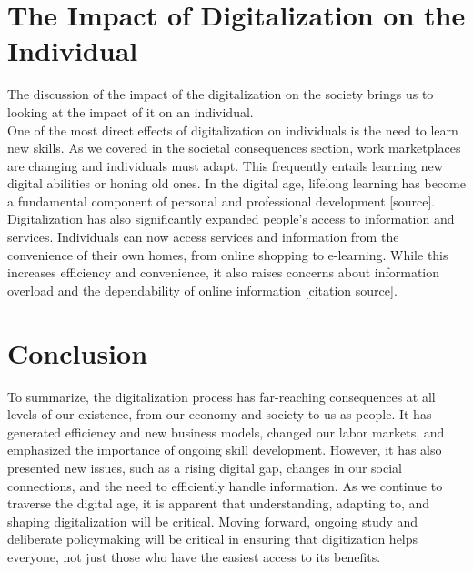 \documentclass[12pt]{article}
\begin{document}
\section{The Impact of Digitalization on the Individual}
The discussion of the impact of the digitalization on the society brings us to looking at the impact of it on an individual. \\
One of the most direct effects of digitalization on individuals is the need to learn new skills. As we covered in the societal consequences section, work marketplaces are changing and individuals must adapt. This frequently entails learning new digital abilities or honing old ones. In the digital age, lifelong learning has become a fundamental component of personal and professional development [source]. \\
Digitalization has also significantly expanded people's access to information and services. Individuals can now access services and information from the convenience of their own homes, from online shopping to e-learning. While this increases efficiency and convenience, it also raises concerns about information overload and the dependability of online information [citation source].

\section{Conclusion}
To summarize, the digitalization process has far-reaching consequences at all levels of our existence, from our economy and society to us as people. It has generated efficiency and new business models, changed our labor markets, and emphasized the importance of ongoing skill development. However, it has also presented new issues, such as a rising digital gap, changes in our social connections, and the need to efficiently handle information. As we continue to traverse the digital age, it is apparent that understanding, adapting to, and shaping digitalization will be critical. Moving forward, ongoing study and deliberate policymaking will be critical in ensuring that digitization helps everyone, not just those who have the easiest access to its benefits.

\newpage

\end{document}
